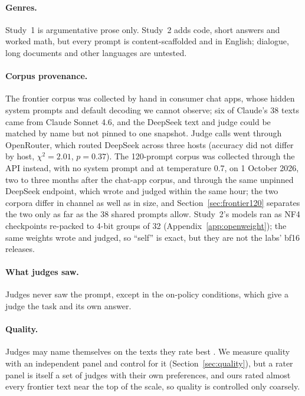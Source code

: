 \paragraph{Genres.} Study~1 is argumentative prose only. Study~2 adds code,
short answers and worked math, but every prompt is content-scaffolded and in
English; dialogue, long documents and other languages are untested.

\paragraph{Corpus provenance.} The frontier corpus was collected by hand in
consumer chat apps, whose hidden system prompts and default decoding we
cannot observe; six of Claude's 38 texts came from Claude Sonnet 4.6, and
the DeepSeek text and judge could be matched by name but not pinned to one
snapshot. Judge calls went through OpenRouter, which routed DeepSeek across
three hosts (accuracy did not differ by host, $\chi^2=2.01$, $p=0.37$). The
120-prompt corpus was collected through the API instead, with no system
prompt and at temperature 0.7, on 1 October 2026, two to three months after
the chat-app corpus, and
through the same unpinned DeepSeek endpoint, which wrote and judged within
the same hour; the two corpora differ in channel as well as in size, and
Section~\ref{sec:frontier120} separates the two only as far as the 38 shared
prompts allow.
Study~2's models ran as NF4 checkpoints re-packed to 4-bit groups of 32
(Appendix~\ref{app:openweight}); the same weights wrote and judged, so
``self'' is exact, but they are not the labs' bf16 releases.

\paragraph{What judges saw.} Judges never saw the prompt, except in the
on-policy conditions, which give a judge the task and its own answer.

\paragraph{Quality.} Judges may name themselves on the texts they rate best
\citep{stamand2026sgtr}. We measure quality with an independent panel and
control for it (Section~\ref{sec:quality}), but a rater panel is itself a
set of judges with their own preferences, and ours rated almost every
frontier text near the top of the scale, so quality is controlled only
coarsely.

